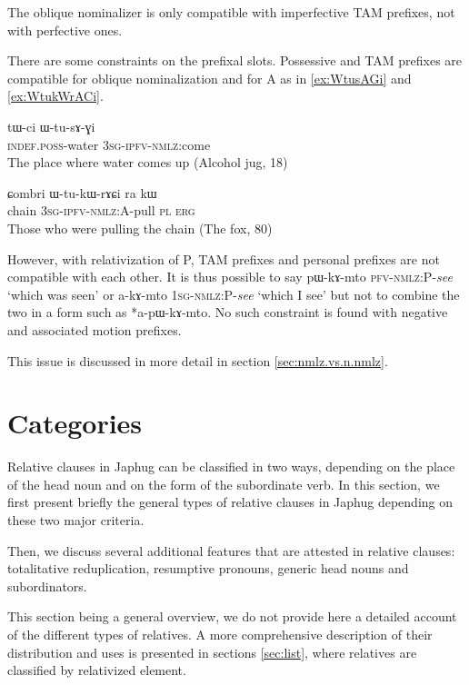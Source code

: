 \documentclass[oldfontcommands,oneside,a4paper,11pt]{article}
\newcommand{\ipa}[1]{{\phon #1}} %
\begin{document}
The oblique nominalizer is only compatible with imperfective TAM prefixes, not with perfective ones. 
 
There are some constraints on  the prefixal slots. Possessive and TAM prefixes are compatible for oblique nominalization and for A as in \ref{ex:WtusAGi} and \ref{ex:WtukWrACi}.

 \begin{exe}
\ex \label{ex:WtusAGi}
\gll
\ipa{tɯ-ci}  	\ipa{ɯ-tu-sɤ-ɣi}  \\
\textsc{indef.poss}-water \textsc{3sg-ipfv-nmlz}:come \\
\glt  The place where water comes up (Alcohol jug, 18)
 \end{exe}
 \begin{exe}
\ex \label{ex:WtukWrACi}
\gll 
\ipa{ɕombri}  	\ipa{ɯ-tu-kɯ-rɤɕi}  	\ipa{ra}  	\ipa{kɯ}  \\
chain \textsc{3sg-ipfv-nmlz:A}-pull \textsc{pl} \textsc{erg} \\
\glt Those who were pulling the chain (The fox, 80)
 \end{exe}

However, with relativization of P, TAM prefixes and personal prefixes are not compatible with each other. It is thus possible to say \ipa{pɯ-kɤ-mto} \textsc{pfv-nmlz:P}-\textit{see} `which was seen' or \ipa{a-kɤ-mto} \textsc{1sg-nmlz:P}-\textit{see} `which I see' but not to combine the two in a form such as *\ipa{a-pɯ-kɤ-mto}. No such constraint is found with negative and associated motion prefixes. 


This issue is discussed in more detail in section \ref{sec:nmlz.vs.n.nmlz}.
  
\section{Categories}

Relative clauses in Japhug can be classified in two ways, depending on the place of the head noun and on the form of the subordinate verb. In this section, we first present briefly the general types of relative clauses in Japhug depending on these two major criteria. 

Then, we discuss several additional features that are attested in relative clauses: totalitative reduplication, resumptive pronouns, generic head nouns and subordinators.

This section being a general overview, we do not provide here a detailed account of the different types of relatives. A more comprehensive description of their distribution and uses is presented in sections \ref{sec:list}, where relatives are classified by relativized element.
\end{document}
